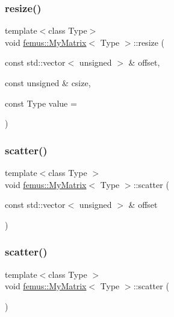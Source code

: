 \mbox{\label{classfemus_1_1_my_matrix_a1851b191f98045063f45f8e371fba98a}} 
\subsubsection{\texorpdfstring{resize()}{resize()}\hspace{0.1cm}{\footnotesize\ttfamily [2/2]}}
{\footnotesize\ttfamily template$<$class Type$>$ \\
void \mbox{\hyperlink{classfemus_1_1_my_matrix}{femus\+::\+My\+Matrix}}$<$ Type $>$\+::resize (\begin{DoxyParamCaption}\item[{const std\+::vector$<$ unsigned $>$ \&}]{offset,  }\item[{const unsigned \&}]{csize,  }\item[{const Type}]{value = {} }\end{DoxyParamCaption})}

\mbox{\label{classfemus_1_1_my_matrix_a5c236953941f1b007220dd91b9721ae0}} 
\subsubsection{\texorpdfstring{scatter()}{scatter()}\hspace{0.1cm}{\footnotesize\ttfamily [1/2]}}
{\footnotesize\ttfamily template$<$class Type $>$ \\
void \mbox{\hyperlink{classfemus_1_1_my_matrix}{femus\+::\+My\+Matrix}}$<$ Type $>$\+::scatter (\begin{DoxyParamCaption}\item[{const std\+::vector$<$ unsigned $>$ \&}]{offset }\end{DoxyParamCaption})}

\mbox{\label{classfemus_1_1_my_matrix_a9c7ae8e6060a465333136319cabcd856}} 
\subsubsection{\texorpdfstring{scatter()}{scatter()}\hspace{0.1cm}{\footnotesize\ttfamily [2/2]}}
{\footnotesize\ttfamily template$<$class Type $>$ \\
void \mbox{\hyperlink{classfemus_1_1_my_matrix}{femus\+::\+My\+Matrix}}$<$ Type $>$\+::scatter (\begin{DoxyParamCaption}{ }\end{DoxyParamCaption})}

